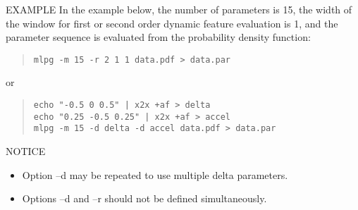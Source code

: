 \begin{qsection}{EXAMPLE}
	In the example below,
        the number of parameters is 15, the width of
        the window for first or second order dynamic feature
        evaluation is 1, and the parameter sequence is
        evaluated from the probability density function:
 \begin{quote}
	\verb!mlpg -m 15 -r 2 1 1 data.pdf > data.par!
 \end{quote}
	or
 \begin{quote}
	\verb!echo "-0.5 0 0.5" | x2x +af > delta! \\
	\verb!echo "0.25 -0.5 0.25" | x2x +af > accel! \\
	\verb!mlpg -m 15 -d delta -d accel data.pdf > data.par!
 \end{quote}
\end{qsection}

\begin{qsection}{NOTICE}
\begin{itemize}
\item Option --d may be repeated to use multiple delta parameters. 
\item Options --d and --r should not be defined simultaneously.
\end{itemize}
\end{qsection}

